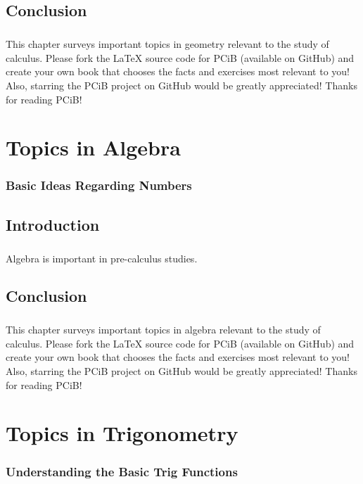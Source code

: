 \documentclass[a4paper,12pt]{book}
\begin{document}
\section*{Conclusion}
\paragraph{}
This chapter surveys important topics in geometry relevant to the study of calculus. Please fork the LaTeX source code for PCiB (available on GitHub) and create your own book that chooses the facts and exercises most relevant to you! Also, starring the PCiB project on GitHub would be greatly appreciated! Thanks for reading PCiB!

\chapter{Topics in Algebra}
\subsection*{Basic Ideas Regarding Numbers}

\section*{Introduction}
\paragraph{}
Algebra is important in pre-calculus studies.

\section*{Conclusion}
\paragraph{}
This chapter surveys important topics in algebra relevant to the study of calculus. Please fork the LaTeX source code for PCiB (available on GitHub) and create your own book that chooses the facts and exercises most relevant to you! Also, starring the PCiB project on GitHub would be greatly appreciated! Thanks for reading PCiB!

\chapter{Topics in Trigonometry}
\subsection*{Understanding the Basic Trig Functions}
\end{document}
